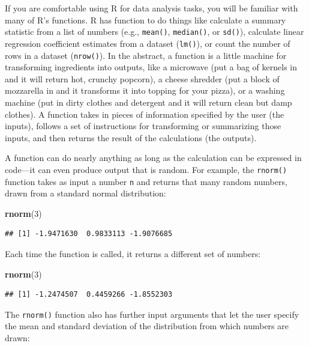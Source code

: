 \documentclass[
]{book}
\newenvironment{Shaded}{\begin{snugshade}}{\end{snugshade}}
\newcommand{\DecValTok}[1]{\textcolor[rgb]{0.00,0.00,0.81}{#1}}
\newcommand{\FunctionTok}[1]{\textcolor[rgb]{0.13,0.29,0.53}{\textbf{#1}}}
\newcommand{\NormalTok}[1]{#1}
\begin{document}
If you are comfortable using R for data analysis tasks, you will be familiar with many of R's functions.
R has function to do things like calculate a summary statistic from a list of numbers (e.g., \texttt{mean()}, \texttt{median()}, or \texttt{sd()}), calculate linear regression coefficient estimates from a dataset (\texttt{lm()}), or count the number of rows in a dataset (\texttt{nrow()}).
In the abstract, a function is a little machine for transforming ingredients into outputs, like a microwave (put a bag of kernels in and it will return hot, crunchy popcorn), a cheese shredder (put a block of mozzarella in and it transforms it into topping for your pizza), or a washing machine (put in dirty clothes and detergent and it will return clean but damp clothes).
A function takes in pieces of information specified by the user (the inputs), follows a set of instructions for transforming or summarizing those inputs, and then returns the result of the calculations (the outputs).

A function can do nearly anything as long as the calculation can be expressed in code---it can even produce output that is random.
For example, the \texttt{rnorm()} function takes as input a number \texttt{n} and returns that many random numbers, drawn from a standard normal distribution:

\begin{Shaded}
\begin{Highlighting}[]
\FunctionTok{rnorm}\NormalTok{(}\DecValTok{3}\NormalTok{)}
\end{Highlighting}
\end{Shaded}

\begin{verbatim}
## [1] -1.9471630  0.9833113 -1.9076685
\end{verbatim}

Each time the function is called, it returns a different set of numbers:

\begin{Shaded}
\begin{Highlighting}[]
\FunctionTok{rnorm}\NormalTok{(}\DecValTok{3}\NormalTok{)}
\end{Highlighting}
\end{Shaded}

\begin{verbatim}
## [1] -1.2474507  0.4459266 -1.8552303
\end{verbatim}

The \texttt{rnorm()} function also has further input arguments that let the user specify the mean and standard deviation of the distribution from which numbers are drawn:
\end{document}
